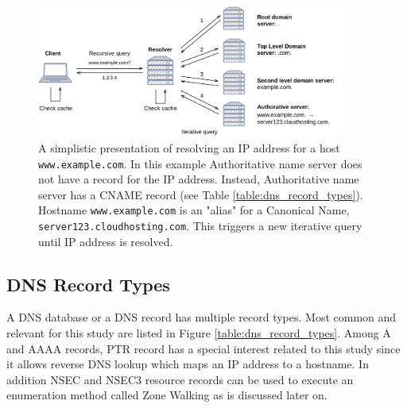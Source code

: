 \begin{figure}[htb]
  \begin{center}
    \includegraphics[width=0.9\textwidth]{resolving.png}
    \caption{A simplistic presentation of resolving an IP address for a host \texttt{www.example.com}. In this example Authoritative name server does not have a record for the IP address. Instead, Authoritative name server has a CNAME record (see Table \ref{table:dns_record_types}). Hostname \texttt{www.example.com} is an "alias" for a Canonical Name, \texttt{server123.cloudhosting.com}. This triggers a new iterative query until IP address is resolved.}
    \label{fig:resolving}
  \end{center}
\end{figure}


\subsection{DNS Record Types}

A DNS database or a DNS record has multiple record types. Most common and relevant for this study are listed in Figure \ref{table:dns_record_types}. Among A and AAAA records,  PTR record has a special interest related to this study since it allows reverse DNS lookup which maps an IP address to a hostname. In addition NSEC and NSEC3 resource records can be used to execute an enumeration method called Zone Walking as is discussed later on.

